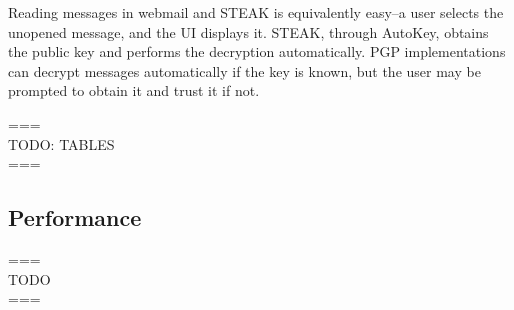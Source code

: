 Reading messages in webmail and STEAK is equivalently easy--a user selects the unopened message, and the UI displays it.  STEAK, through AutoKey, obtains the public key and performs the decryption automatically.  PGP implementations can decrypt messages automatically if the key is known, but the user may be prompted to obtain it and trust it if not.

===\\
TODO: TABLES \\
===\\

\subsection{Performance}
===\\
TODO \\
===\\
